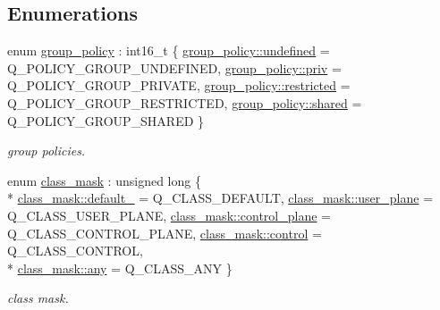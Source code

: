 \subsection*{Enumerations}
\begin{DoxyCompactItemize}
\item 
enum \hyperlink{namespacepfq_ac41249c8510558905b01fa4d866a38d7}{group\+\_\+policy} \+: int16\+\_\+t \{ \hyperlink{namespacepfq_ac41249c8510558905b01fa4d866a38d7a5e543256c480ac577d30f76f9120eb74}{group\+\_\+policy\+::undefined} = Q\+\_\+\+P\+O\+L\+I\+C\+Y\+\_\+\+G\+R\+O\+U\+P\+\_\+\+U\+N\+D\+E\+F\+I\+N\+ED, 
\hyperlink{namespacepfq_ac41249c8510558905b01fa4d866a38d7a908b453051b556e053731714a5193921}{group\+\_\+policy\+::priv} = Q\+\_\+\+P\+O\+L\+I\+C\+Y\+\_\+\+G\+R\+O\+U\+P\+\_\+\+P\+R\+I\+V\+A\+TE, 
\hyperlink{namespacepfq_ac41249c8510558905b01fa4d866a38d7ac89b33f8b3f6f452ef6f07d397b5dcdf}{group\+\_\+policy\+::restricted} = Q\+\_\+\+P\+O\+L\+I\+C\+Y\+\_\+\+G\+R\+O\+U\+P\+\_\+\+R\+E\+S\+T\+R\+I\+C\+T\+ED, 
\hyperlink{namespacepfq_ac41249c8510558905b01fa4d866a38d7a9e81e7b963c71363e2fb3eefcfecfc0e}{group\+\_\+policy\+::shared} = Q\+\_\+\+P\+O\+L\+I\+C\+Y\+\_\+\+G\+R\+O\+U\+P\+\_\+\+S\+H\+A\+R\+ED
 \}\begin{DoxyCompactList}\small\item\em group policies. \end{DoxyCompactList}
\item 
enum \hyperlink{namespacepfq_a96af1f5ed530eff563eb917516758fbb}{class\+\_\+mask} \+: unsigned long \{ \\*
\hyperlink{namespacepfq_a96af1f5ed530eff563eb917516758fbba172b03053216c6158fe380805998ad6c}{class\+\_\+mask\+::default\+\_\+} = Q\+\_\+\+C\+L\+A\+S\+S\+\_\+\+D\+E\+F\+A\+U\+LT, 
\hyperlink{namespacepfq_a96af1f5ed530eff563eb917516758fbba539d70f37267eda88597177e215a6d2a}{class\+\_\+mask\+::user\+\_\+plane} = Q\+\_\+\+C\+L\+A\+S\+S\+\_\+\+U\+S\+E\+R\+\_\+\+P\+L\+A\+NE, 
\hyperlink{namespacepfq_a96af1f5ed530eff563eb917516758fbba1ed75f78f4a1cf2529490db57b294978}{class\+\_\+mask\+::control\+\_\+plane} = Q\+\_\+\+C\+L\+A\+S\+S\+\_\+\+C\+O\+N\+T\+R\+O\+L\+\_\+\+P\+L\+A\+NE, 
\hyperlink{namespacepfq_a96af1f5ed530eff563eb917516758fbbafc5364bf9dbfa34954526becad136d4b}{class\+\_\+mask\+::control} = Q\+\_\+\+C\+L\+A\+S\+S\+\_\+\+C\+O\+N\+T\+R\+OL, 
\\*
\hyperlink{namespacepfq_a96af1f5ed530eff563eb917516758fbba100b8cad7cf2a56f6df78f171f97a1ec}{class\+\_\+mask\+::any} = Q\+\_\+\+C\+L\+A\+S\+S\+\_\+\+A\+NY
 \}\begin{DoxyCompactList}\small\item\em class mask. \end{DoxyCompactList}
\end{DoxyCompactItemize}
